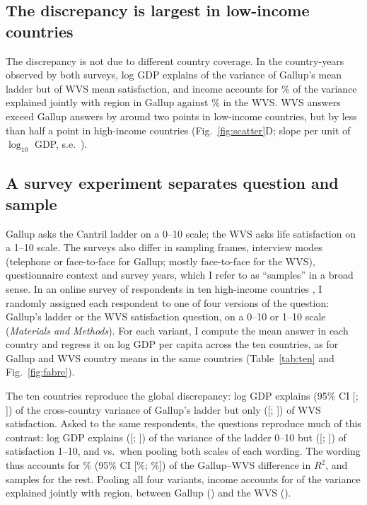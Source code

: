 \documentclass[10pt]{article}
\begin{document}
\subsection*{The discrepancy is largest in low-income countries}

The discrepancy is not due to different country coverage. In the \nCommon country-years observed by both surveys, log GDP explains \RtwoCommonGallup of the variance of Gallup's mean ladder but \RtwoCommonWVS of WVS mean satisfaction, and income accounts for \shareIncomeCommonGallup\% of the variance explained jointly with region in Gallup against \shareIncomeCommonWVS\% in the WVS. WVS answers exceed Gallup answers by around two points in low-income countries, but by less than half a point in high-income countries (Fig.~\ref{fig:scatter}D; slope \slopeGapGDP per unit of $\log_{10}$ GDP, s.e.\ \seSlopeGapGDP).


\subsection*{A survey experiment separates question and sample}

Gallup asks the Cantril ladder on a 0--10 scale; the WVS asks life satisfaction on a 1--10 scale. The surveys also differ in sampling frames, interview modes (telephone or face-to-face for Gallup; mostly face-to-face for the WVS), questionnaire context %
and survey years, which I refer to as ``samples'' in a broad sense. In an online survey of \nFabre respondents in ten high-income countries \citep{fabre_public_2025}, I randomly assigned each respondent to one of four versions of the question: Gallup's ladder or the WVS satisfaction question, on a 0--10 or 1--10 scale (\textit{Materials and Methods}). For each variant, I compute the mean answer in each country and regress it on log GDP per capita across the ten countries, as for Gallup and WVS country means in the same countries (Table~\ref{tab:ten} and Fig.~\ref{fig:fabre}).

The ten countries reproduce the global discrepancy: log GDP explains \RtwoTenGallup (95\% CI [\decompLowRGallup; \decompHighRGallup]) of the cross-country variance of Gallup's ladder but only \RtwoTenWVS ([\decompLowRWvs; \decompHighRWvs]) of WVS satisfaction. Asked to the same respondents, the questions reproduce much of this contrast: log GDP explains \RtwoTenFabreLadder ([\decompLowRFabreLadder; \decompHighRFabreLadder]) of the variance of the ladder 0--10 but \RtwoTenFabreSatisfaction ([\decompLowRFabreSatisfaction; \decompHighRFabreSatisfaction]) of satisfaction 1--10, and \RtwoTenFabreLadderPooled vs.\ \RtwoTenFabreSatisfactionPooled when pooling both scales of each wording. The wording thus accounts for \decompShareRWordingPooledPct\% (95\% CI [\decompLowShareRWordingPooledPct\%; \decompHighShareRWordingPooledPct\%]) of the Gallup--WVS difference in $R^2$, and samples for the rest. %
Pooling all four variants, income accounts for \shareIncomeTenFabreAll of the variance explained jointly with region, between Gallup (\shareIncomeTenGallup) and the WVS (\shareIncomeTenWVS).
\end{document}
